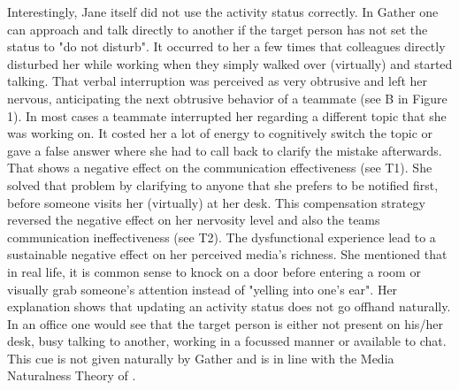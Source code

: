 \documentclass[man]{apa7}
\begin{document}
Interestingly, Jane itself did not use the activity status correctly. In Gather one can approach and talk directly to another if the target person has not set the status to "do not disturb". It occurred to her a few times that colleagues directly disturbed her while working when they simply walked over (virtually) and started talking. That verbal interruption was perceived as very obtrusive and left her nervous, anticipating the next obtrusive behavior of a teammate (see B in Figure 1). In most cases a teammate interrupted her regarding a different topic that she was working on. It costed her a lot of energy to cognitively switch the topic or gave a false answer where she had to call back to clarify the mistake afterwards. That shows a negative effect on the communication effectiveness (see T1). She solved that problem by clarifying to anyone that she prefers to be notified first, before someone visits her (virtually) at her desk. This compensation strategy reversed the negative effect on her nervosity level and also the teams communication ineffectiveness (see T2). The dysfunctional experience lead to a sustainable negative effect on her perceived media's richness. She mentioned that in real life, it is common sense to knock on a door before entering a room or visually grab someone's attention instead of "yelling into one's ear". Her explanation shows that updating an activity status does not go offhand naturally. In an office one would see that the target person is either not present on his/her desk, busy talking to another, working in a focussed manner or available to chat. This cue is not given naturally by Gather and is in line with the Media Naturalness Theory of \parencite{Kock2005}.
\end{document}
